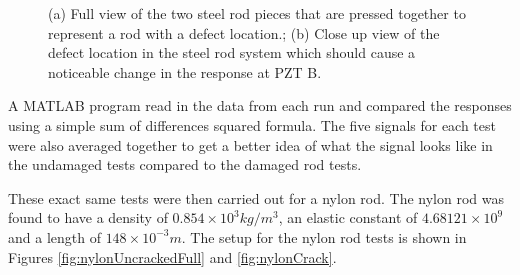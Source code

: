 \begin{figure}
\begin{subfigmatrix}{2}
\end{subfigmatrix}

   \caption[all]
   { \label{fig:steelCrack}
(a) Full view of the two steel rod pieces that are pressed together to represent a rod with a defect location.;
(b) Close up view of the defect location in the steel rod system which should cause a noticeable change in the response at PZT B.
 }
   \end{figure}
   
A MATLAB program read in the data from each run and compared the responses using a simple sum of differences squared formula. The five signals for each test were also averaged together to get a better idea of what the signal looks like in the undamaged tests compared to the damaged rod tests.

These exact same tests were then carried out for a nylon rod. The nylon rod was found to have a density of $0.854 \times 10^3 kg/m^3$, an elastic constant of $4.68121 \times 10^9$ and a length of $148 \times 10^{-3} m$. The setup for the nylon rod tests is shown in Figures \ref{fig:nylonUncrackedFull} and \ref{fig:nylonCrack}.


